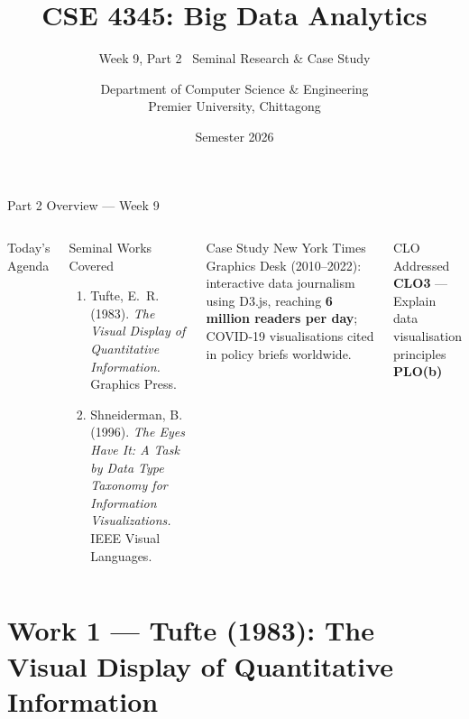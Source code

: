 \documentclass[aspectratio=169,10pt]{beamer}
\title[CSE 4345 \textbar{} Week 9, Part 2]{CSE 4345: Big Data Analytics}
\subtitle{Week 9, Part 2 \textemdash\ Seminal Research \& Case Study}
\author[Dept.\ of CSE]{Department of Computer Science \& Engineering\\[4pt]
       \small Premier University, Chittagong}
\institute{}
\date{Semester 2026}
\begin{document}

\begin{frame}
  \titlepage
\end{frame}

\begin{frame}{Part 2 Overview — Week 9}
  \begin{columns}[T]
      \begin{block}{Today's Agenda}
        \tableofcontents
      \end{block}
      \begin{exampleblock}{Seminal Works Covered}
        \begin{enumerate}
          \item Tufte, E.~R. (1983).
                \textit{The Visual Display of Quantitative
                Information.} Graphics Press.
          \item Shneiderman, B. (1996).
                \textit{The Eyes Have It: A Task by Data Type
                Taxonomy for Information Visualizations.}
                IEEE Visual Languages.
        \end{enumerate}
      \end{exampleblock}
      \vspace{6pt}
      \begin{alertblock}{Case Study}
        New York Times Graphics Desk (2010--2022):
        interactive data journalism using D3.js, reaching
        \textbf{6 million readers per day}; COVID-19
        visualisations cited in policy briefs worldwide.
      \end{alertblock}
      \vspace{4pt}
      \begin{block}{CLO Addressed}
        \textbf{CLO3} — Explain data visualisation principles\\
        \textbf{PLO(b)}
      \end{block}
  \end{columns}
\end{frame}

\section{Work 1 — Tufte (1983): The Visual Display of Quantitative Information}
\end{document}
